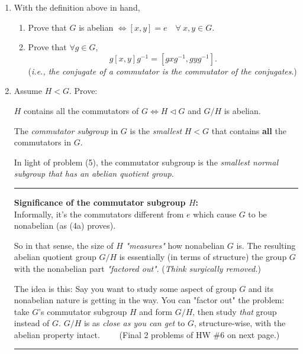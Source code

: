 \begin{enumerate}
    \item With the definition above in hand,
    \begin{enumerate}
        \item Prove that \( G \) is abelian \( \iff [x,y] = e \quad \forall \ x,y \in G \).
        \item Prove that \( \forall g \in G \), 
        \[
        g[x,y]g^{-1} = [g x g^{-1}, g y g^{-1}].
        \]
        (\textit{i.e., the conjugate of a commutator is the commutator of the conjugates}.) \\ \steezybreak
    \end{enumerate}
    
    \item Assume \( H < G \). Prove:
    
    \( H \) contains all the commutators of \( G \iff H \triangleleft G \) and \( G/H \) is abelian. \\ \steezybreak

    \begin{definition}
        The \textit{commutator subgroup} in \( G \) is the \textit{smallest} \( H < G \) that contains \textbf{all} the commutators in \( G \).
    \end{definition}
    
    In light of problem (5), the commutator subgroup is the \textit{smallest normal subgroup that has an abelian quotient group}. \\ \steezybreak
    
    \noindent \rule{\textwidth}{0.4pt}
    
    \textbf{Significance of the commutator subgroup \( H \):} \\
    Informally, it's the commutators different from \( e \) which cause \( G \) to be nonabelian (as (4a) proves). 
    
    So in that sense, the size of \( H \) \textit{"measures"} how nonabelian \( G \) is. The resulting abelian quotient group \( G/H \) is essentially (in terms of structure) the group \( G \) with the nonabelian part \textit{"factored out"}. (\textit{Think surgically removed.}) \\ \steezybreak
    
    The idea is this: Say you want to study some aspect of group \( G \) and its nonabelian nature is getting in the way. You can "factor out" the problem: take \( G \)'s commutator subgroup \( H \) and form \( G/H \), then study \textit{that} group instead of \( G \). \( G/H \) is as \textit{close as you can get} to \( G \), structure-wise, with the abelian property intact. \ \ \ \ (Final 2 problems of HW \#6 on next page.)\\ \steezybreak
    \noindent \rule{\textwidth}{0.4pt}
    \newpage


\end{enumerate}
